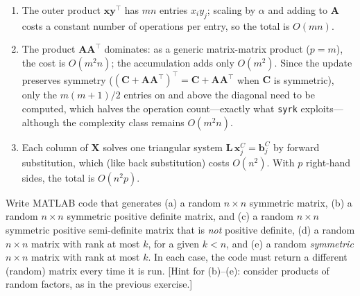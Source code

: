 \begin{solution}
    \begin{enumerate}[label=(\alph*)]
        \item The outer product $\mathbf{x}\mathbf{y}^\top$ has $mn$ entries $x_i y_j$; scaling by $\alpha$ and adding to $\mathbf{A}$ costs a constant number of operations per entry, so the total is $O(mn)$.
        \item The product $\mathbf{A}\mathbf{A}^\top$ dominates: as a generic matrix-matrix product ($p = m$), the cost is $O(m^2 n)$; the accumulation adds only $O(m^2)$. Since the update preserves symmetry ($(\mathbf{C} + \mathbf{A}\mathbf{A}^\top)^\top = \mathbf{C} + \mathbf{A}\mathbf{A}^\top$ when $\mathbf{C}$ is symmetric), only the $m(m+1)/2$ entries on and above the diagonal need to be computed, which halves the operation count---exactly what \texttt{syrk} exploits---although the complexity class remains $O(m^2 n)$.
        \item Each column of $\mathbf{X}$ solves one triangular system $\mathbf{L}\, \mathbf{x}^C_j = \mathbf{b}^C_j$ by forward substitution, which (like back substitution) costs $O(n^2)$. With $p$ right-hand sides, the total is $O(n^2 p)$.
    \end{enumerate}
\end{solution}

\begin{exercise} %
    Write MATLAB code that generates (a) a random $n \times n$ symmetric matrix, (b) a random $n \times n$ symmetric positive definite matrix, and (c) a random $n \times n$ symmetric positive semi-definite matrix that is \emph{not} positive definite, (d) a random $n \times n$ matrix with rank at most $k$, for a given $k < n$, and (e) a random \emph{symmetric} $n \times n$ matrix with rank at most $k$. In each case, the code must return a different (random) matrix every time it is run. [Hint for (b)--(e): consider products of random factors, as in the previous exercise.]
\end{exercise}

